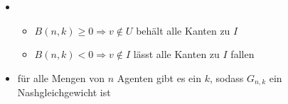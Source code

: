 \topbreak
	\vspace*{-1.5\baselineskip}
	\begin{itemize}
		\item[] \ \vspace*{-\baselineskip} 
			\begin{itemize}
				\item $B(n,k)\geq 0\Rightarrow v\notin U$ behält alle Kanten zu $I$
				\item $B(n,k) < 0 \Rightarrow v\notin I$ lässt alle Kanten zu $I$ fallen
			\end{itemize}
		\item für alle Mengen von $n$ Agenten gibt es ein $k$, sodass $G_{n,k}$ ein Nashgleichgewicht ist
	\end{itemize}